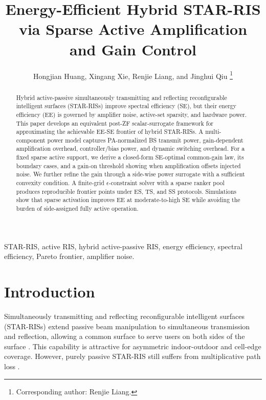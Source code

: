 \documentclass[journal]{IEEEtran}
\begin{document}
\title{Energy-Efficient Hybrid STAR-RIS via Sparse Active Amplification and Gain Control}

\author{Hongjian Huang, Xingang Xie, Renjie Liang, and Jinghui Qiu%
\thanks{Corresponding author: Renjie Liang.}}
\maketitle

\begin{abstract}
Hybrid active-passive simultaneously transmitting and reflecting reconfigurable intelligent surfaces (STAR-RISs) improve spectral efficiency (SE), but their energy efficiency (EE) is governed by amplifier noise, active-set sparsity, and hardware power. This paper develops an equivalent post-ZF scalar-surrogate framework for approximating the achievable EE-SE frontier of hybrid STAR-RISs. A multi-component power model captures PA-normalized BS transmit power, gain-dependent amplification overhead, controller/bias power, and dynamic switching overhead. For a fixed sparse active support, we derive a closed-form SE-optimal common-gain law, its boundary cases, and a gain-on threshold showing when amplification offsets injected noise. We further refine the gain through a side-wise power surrogate with a sufficient convexity condition. A finite-grid $\epsilon$-constraint solver with a sparse ranker pool produces reproducible frontier points under ES, TS, and SS protocols. Simulations show that sparse activation improves EE at moderate-to-high SE while avoiding the burden of side-assigned fully active operation.
\end{abstract}

\begin{IEEEkeywords}
STAR-RIS, active RIS, hybrid active-passive RIS, energy efficiency, spectral efficiency, Pareto frontier, amplifier noise.
\end{IEEEkeywords}

\section{Introduction}
Simultaneously transmitting and reflecting reconfigurable intelligent surfaces (STAR-RISs) extend passive beam manipulation to simultaneous transmission and reflection, allowing a common surface to serve users on both sides of the surface \cite{liu2021star,mu2022star}. This capability is attractive for asymmetric indoor-outdoor and cell-edge coverage. However, purely passive STAR-RIS still suffers from multiplicative path loss \cite{wu2019irs}.
\end{document}
